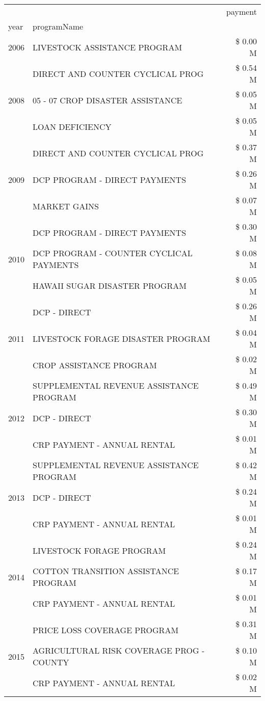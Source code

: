 \begin{tabular}{llr}
\toprule
 &  & payment \\
year & programName &  \\
\midrule
2006 & LIVESTOCK ASSISTANCE PROGRAM & \$ 0.00 M \\
\cline{1-3}
\multirow[t]{3}{*}{2008} & DIRECT AND COUNTER CYCLICAL PROG & \$ 0.54 M \\
 & 05 - 07 CROP DISASTER ASSISTANCE & \$ 0.05 M \\
 & LOAN DEFICIENCY & \$ 0.05 M \\
\cline{1-3}
\multirow[t]{3}{*}{2009} & DIRECT AND COUNTER CYCLICAL PROG & \$ 0.37 M \\
 & DCP PROGRAM - DIRECT PAYMENTS & \$ 0.26 M \\
 & MARKET GAINS & \$ 0.07 M \\
\cline{1-3}
\multirow[t]{3}{*}{2010} & DCP PROGRAM - DIRECT PAYMENTS & \$ 0.30 M \\
 & DCP PROGRAM - COUNTER CYCLICAL PAYMENTS & \$ 0.08 M \\
 & HAWAII SUGAR DISASTER PROGRAM & \$ 0.05 M \\
\cline{1-3}
\multirow[t]{3}{*}{2011} & DCP - DIRECT & \$ 0.26 M \\
 & LIVESTOCK FORAGE DISASTER PROGRAM & \$ 0.04 M \\
 & CROP ASSISTANCE PROGRAM & \$ 0.02 M \\
\cline{1-3}
\multirow[t]{3}{*}{2012} & SUPPLEMENTAL REVENUE ASSISTANCE PROGRAM & \$ 0.49 M \\
 & DCP - DIRECT & \$ 0.30 M \\
 & CRP PAYMENT - ANNUAL RENTAL & \$ 0.01 M \\
\cline{1-3}
\multirow[t]{3}{*}{2013} & SUPPLEMENTAL REVENUE ASSISTANCE PROGRAM & \$ 0.42 M \\
 & DCP - DIRECT & \$ 0.24 M \\
 & CRP PAYMENT - ANNUAL RENTAL & \$ 0.01 M \\
\cline{1-3}
\multirow[t]{3}{*}{2014} & LIVESTOCK FORAGE PROGRAM & \$ 0.24 M \\
 & COTTON TRANSITION ASSISTANCE PROGRAM & \$ 0.17 M \\
 & CRP PAYMENT - ANNUAL RENTAL & \$ 0.01 M \\
\cline{1-3}
\multirow[t]{3}{*}{2015} & PRICE LOSS COVERAGE PROGRAM & \$ 0.31 M \\
 & AGRICULTURAL RISK COVERAGE PROG - COUNTY & \$ 0.10 M \\
 & CRP PAYMENT - ANNUAL RENTAL & \$ 0.02 M \\

\end{tabular}
